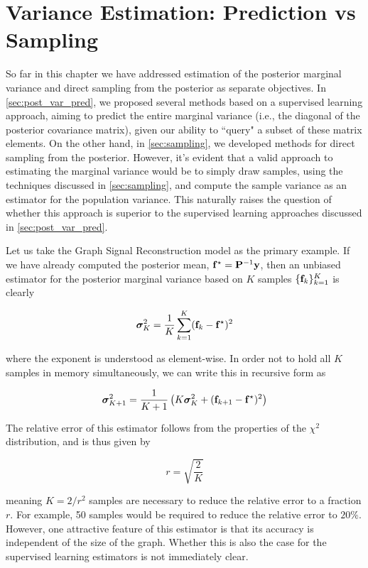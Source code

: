 \section{Variance Estimation: Prediction vs Sampling}

\label{sec:comparison}

So far in this chapter we have addressed estimation of the posterior marginal variance and direct sampling from the posterior as separate objectives. In \cref{sec:post_var_pred}, we proposed several methods based on a supervised learning approach, aiming to predict the entire marginal variance (i.e., the diagonal of the posterior covariance matrix), given our ability to ``query" a subset of these matrix elements. On the other hand, in \cref{sec:sampling}, we developed methods for direct sampling from the posterior. However, it's evident that a valid approach to estimating the marginal variance would be to simply draw samples, using the techniques discussed in \cref{sec:sampling}, and compute the sample variance as an estimator for the population variance. This naturally raises the question of whether this approach is superior to the supervised learning approaches discussed in \cref{sec:post_var_pred}. 

Let us take the Graph Signal Reconstruction model as the primary example. If we have already computed the posterior mean, $\mathbf{f}^\star = \mathbf{P}^{-1}\mathbf{y}$, then an unbiased estimator for the posterior marginal variance based on $K$ samples $\{\mathbf{f}_k\}_{k=1}^K$ is clearly

\begin{equation}
    \boldsymbol{\sigma}^2_K = \frac{1}{K} \sum_{k=1}^K (\mathbf{f}_k - \mathbf{f}^\star)^2
\end{equation}

where the exponent is understood as element-wise. In order not to hold all $K$ samples in memory simultaneously, we can write this in recursive form as 

\begin{equation}
    \boldsymbol{\sigma}^2_{K+1} = \frac{1}{K + 1} \left( K \boldsymbol{\sigma}^2_K  + (\mathbf{f}_{k+1} - \mathbf{f}^\star)^2\right)
\end{equation}

The relative error of this estimator follows from the properties of the $\chi^2$ distribution, and is thus given by 

\begin{equation}
    r = \sqrt{\frac{2}{K}}
\end{equation}

meaning $K = 2 / r^2$ samples are necessary to reduce the relative error to a fraction $r$. For example, 50 samples would be required to reduce the relative error to $20\%$. However, one attractive feature of this estimator is that its accuracy is independent of the size of the graph. Whether this is also the case for the supervised learning estimators is not immediately clear. 

